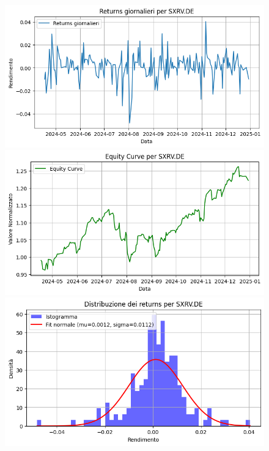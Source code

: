 \documentclass{article}%
\begin{document}
\begin{figure}[htbp]%
\begin{minipage}{0.31\textwidth}%
\includegraphics[width=\linewidth]{immagini_tickers/SXRV.DE_returns_plot.png}%
\end{minipage}%
\begin{minipage}{0.31\textwidth}%
\includegraphics[width=\linewidth]{immagini_tickers/SXRV.DE_equity_curve.png}%
\end{minipage}%
\begin{minipage}{0.31\textwidth}%
\includegraphics[width=\linewidth]{immagini_tickers/SXRV.DE_distribuzione_returns.png}%
\end{minipage}%
\end{figure}
\end{document}
